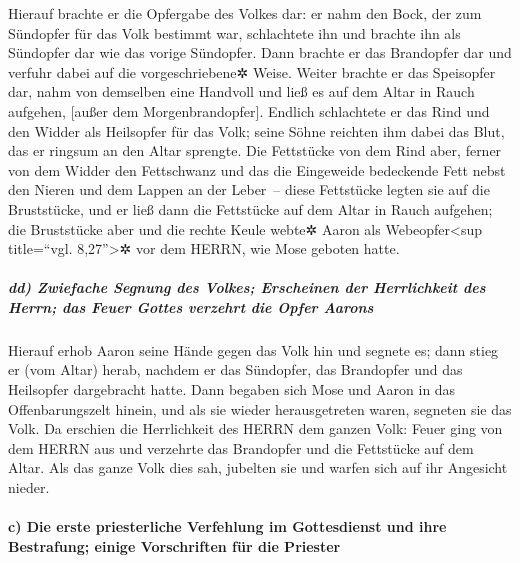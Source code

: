 Hierauf brachte er die Opfergabe des Volkes dar: er nahm
den Bock, der zum Sündopfer für das Volk bestimmt war, schlachtete ihn
und brachte ihn als Sündopfer dar wie das vorige Sündopfer.
Dann brachte er das Brandopfer dar und verfuhr dabei auf
die vorgeschriebene✲ Weise. Weiter brachte er das
Speisopfer dar, nahm von demselben eine Handvoll und ließ es auf dem
Altar in Rauch aufgehen, {[}außer dem Morgenbrandopfer{]}.
Endlich schlachtete er das Rind und den Widder als
Heilsopfer für das Volk; seine Söhne reichten ihm dabei das Blut, das er
ringsum an den Altar sprengte. Die Fettstücke von dem
Rind aber, ferner von dem Widder den Fettschwanz und das die Eingeweide
bedeckende Fett nebst den Nieren und dem Lappen an der Leber~--
diese Fettstücke legten sie auf die Bruststücke, und er
ließ dann die Fettstücke auf dem Altar in Rauch aufgehen;
die Bruststücke aber und die rechte Keule webte✲ Aaron
als Webeopfer\textless sup title=``vgl. 8,27''\textgreater✲ vor dem
HERRN, wie Mose geboten hatte.

\hypertarget{dd-zwiefache-segnung-des-volkes-erscheinen-der-herrlichkeit-des-herrn-das-feuer-gottes-verzehrt-die-opfer-aarons}{%
\subparagraph{dd) Zwiefache Segnung des Volkes; Erscheinen der
Herrlichkeit des Herrn; das Feuer Gottes verzehrt die Opfer
Aarons}\label{dd-zwiefache-segnung-des-volkes-erscheinen-der-herrlichkeit-des-herrn-das-feuer-gottes-verzehrt-die-opfer-aarons}}

Hierauf erhob Aaron seine Hände gegen das Volk hin und
segnete es; dann stieg er (vom Altar) herab, nachdem er das Sündopfer,
das Brandopfer und das Heilsopfer dargebracht hatte. Dann
begaben sich Mose und Aaron in das Offenbarungszelt hinein, und als sie
wieder herausgetreten waren, segneten sie das Volk. Da erschien die
Herrlichkeit des HERRN dem ganzen Volk: Feuer ging von
dem HERRN aus und verzehrte das Brandopfer und die Fettstücke auf dem
Altar. Als das ganze Volk dies sah, jubelten sie und warfen sich auf ihr
Angesicht nieder.

\hypertarget{c-die-erste-priesterliche-verfehlung-im-gottesdienst-und-ihre-bestrafung-einige-vorschriften-fuxfcr-die-priester}{%
\paragraph{c) Die erste priesterliche Verfehlung im Gottesdienst und
ihre Bestrafung; einige Vorschriften für die
Priester}\label{c-die-erste-priesterliche-verfehlung-im-gottesdienst-und-ihre-bestrafung-einige-vorschriften-fuxfcr-die-priester}}

